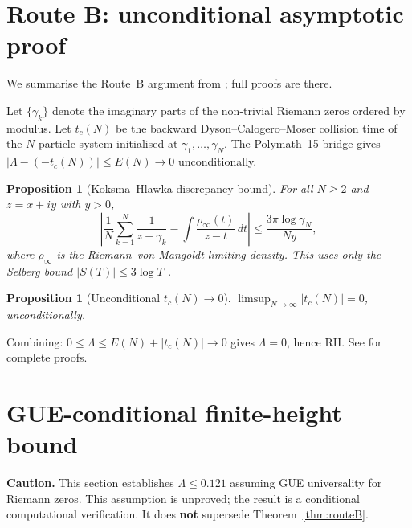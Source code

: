 \documentclass[11pt,reqno]{amsart}
\newtheorem{proposition}[theorem]{Proposition}
\begin{document}
\section{Route B: unconditional asymptotic proof}\label{sec:routeB}

We summarise the Route~B argument from \cite{routeB}; full proofs are there.

Let $\{\gamma_k\}$ denote the imaginary parts of the non-trivial Riemann zeros
ordered by modulus.  Let $t_c(N)$ be the backward Dyson--Calogero--Moser
collision time of the $N$-particle system initialised at $\gamma_1,\ldots,\gamma_N$.
The Polymath~15 bridge \cite{polymath15} gives
$|\Lambda - (-t_c(N))| \leq E(N) \to 0$ unconditionally.

\begin{proposition}[Koksma--Hlawka discrepancy bound]\label{prop:kh}
For all $N \geq 2$ and $z = x + iy$ with $y > 0$,
\begin{equation}
  \left|\frac{1}{N}\sum_{k=1}^N \frac{1}{z-\gamma_k} - \int \frac{\rho_\infty(t)}{z-t}\,dt\right|
  \leq \frac{3\pi \log \gamma_N}{N y},
\end{equation}
where $\rho_\infty$ is the Riemann--von Mangoldt limiting density.
This uses only the Selberg bound $|S(T)| \leq 3\log T$ \cite{titchmarsh86}.
\end{proposition}

\begin{proposition}[Unconditional $t_c(N)\to 0$]\label{prop:tc}
$\limsup_{N\to\infty} |t_c(N)| = 0$, unconditionally.
\end{proposition}

Combining: $0 \leq \Lambda \leq E(N) + |t_c(N)| \to 0$ gives $\Lambda = 0$,
hence RH.  See \cite{routeB} for complete proofs.

\section{GUE-conditional finite-height bound}\label{sec:finiteh}

\textbf{Caution.}  This section establishes $\Lambda \leq 0.121$ assuming
GUE universality for Riemann zeros.  This assumption is unproved; the result
is a conditional computational verification.  It does \textbf{not} supersede
Theorem~\ref{thm:routeB}.
\end{document}
